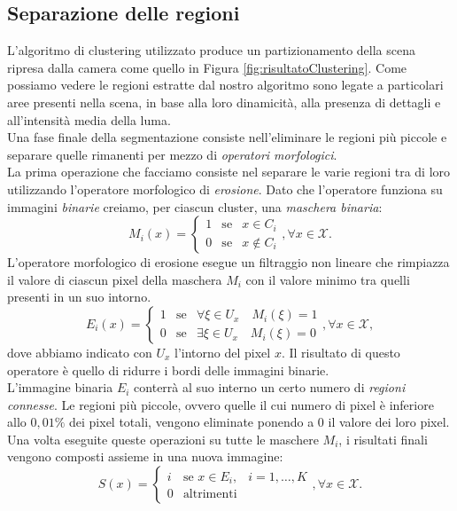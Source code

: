 \subsection{Separazione delle regioni}
L'algoritmo di clustering utilizzato produce un partizionamento della scena ripresa dalla camera come quello in Figura \ref{fig:risultatoClustering}.
Come possiamo vedere le regioni estratte dal nostro algoritmo sono legate a particolari aree presenti nella scena, in base alla loro dinamicit\`a, alla presenza di dettagli e all'intensit\`a media della luma.\\
Una fase finale della segmentazione consiste nell'eliminare le regioni pi\`u piccole e separare quelle rimanenti per mezzo di \textit{operatori morfologici}.\\
La prima operazione che facciamo consiste nel separare le varie regioni tra di loro utilizzando l'operatore morfologico di \textit{erosione}.
Dato che l'operatore funziona su immagini \textit{binarie} creiamo, per ciascun cluster, una \textit{maschera binaria}:
\[M_i(x) =  \left\{ \begin{array}{rcl}
1 & \mbox{se} & x \in C_i \\
0 & \mbox{se} & x \notin C_i
\end{array}\right. , \forall x \in \mathcal{X}.\]
L'operatore morfologico di erosione esegue un filtraggio non lineare che rimpiazza il valore di ciascun pixel della maschera $M_i$ con il valore minimo tra quelli presenti in un suo intorno.
\[E_i(x) =  \left\{ \begin{array}{rcl}
1 & \mbox{se} & \forall \xi \in U_x \quad M_i(\xi) = 1 \\
0 & \mbox{se} & \exists \xi \in U_x \quad M_i(\xi) = 0
\end{array}\right. , \forall x \in \mathcal{X},\]
dove abbiamo indicato con $U_x$ l'intorno del pixel $x$.
Il risultato di questo operatore \`e quello di ridurre i bordi delle immagini binarie.\\
L'immagine binaria $E_i$ conterr\`a al suo interno un certo numero di \textit{regioni connesse}.
Le regioni pi\`u piccole, ovvero quelle il cui numero di pixel \`e inferiore allo $0,01\%$ dei pixel totali, vengono eliminate ponendo a $0$ il valore dei loro pixel.
Una volta eseguite queste operazioni su tutte le maschere $M_i$, i risultati finali vengono composti assieme in una nuova immagine:
\[ S(x)= \left\{ \begin{array}{rcll}
i & \mbox{se }  x \in E_i, & i=1,\dots,K \\
0 & \mbox{altrimenti} 
\end{array}\right. , \forall x \in \mathcal{X}.\]
